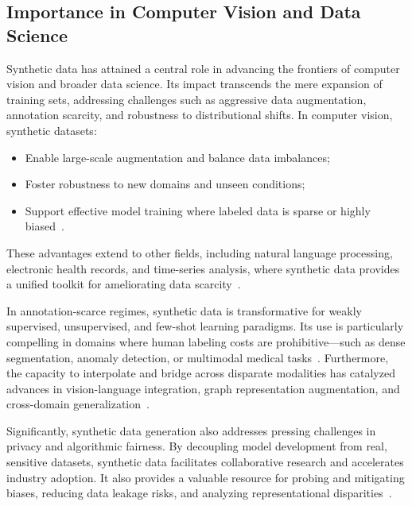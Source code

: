 \subsection{Importance in Computer Vision and Data Science}

Synthetic data has attained a central role in advancing the frontiers of computer vision and broader data science. Its impact transcends the mere expansion of training sets, addressing challenges such as aggressive data augmentation, annotation scarcity, and robustness to distributional shifts. In computer vision, synthetic datasets:
\begin{itemize}
    \item Enable large-scale augmentation and balance data imbalances;
    \item Foster robustness to new domains and unseen conditions;
    \item Support effective model training where labeled data is sparse or highly biased~\cite{ref5,ref6,ref10,ref13,ref14,ref15,ref16,ref17,ref18,ref19,ref21,ref22,ref24,ref25,ref26,ref27,ref28,ref30,ref31,ref32,ref34,ref41,ref43,ref45,ref51,ref52,ref53,ref54,ref55,ref59,ref61,ref62,ref63,ref64,ref65,ref74,ref75,ref81,ref82,ref89,ref90}.
\end{itemize}
These advantages extend to other fields, including natural language processing, electronic health records, and time-series analysis, where synthetic data provides a unified toolkit for ameliorating data scarcity~\cite{ref13,ref62,ref63,ref64,ref81}.

In annotation-scarce regimes, synthetic data is transformative for weakly supervised, unsupervised, and few-shot learning paradigms. Its use is particularly compelling in domains where human labeling costs are prohibitive—such as dense segmentation, anomaly detection, or multimodal medical tasks~\cite{ref12,ref23,ref24,ref26,ref31,ref32,ref51,ref53,ref54,ref55,ref59,ref74,ref81}. Furthermore, the capacity to interpolate and bridge across disparate modalities has catalyzed advances in vision-language integration, graph representation augmentation, and cross-domain generalization~\cite{ref14,ref18,ref64,ref81,ref89,ref90}.

Significantly, synthetic data generation also addresses pressing challenges in privacy and algorithmic fairness. By decoupling model development from real, sensitive datasets, synthetic data facilitates collaborative research and accelerates industry adoption. It also provides a valuable resource for probing and mitigating biases, reducing data leakage risks, and analyzing representational disparities~\cite{ref43,ref51,ref52,ref62,ref87,ref88}.

